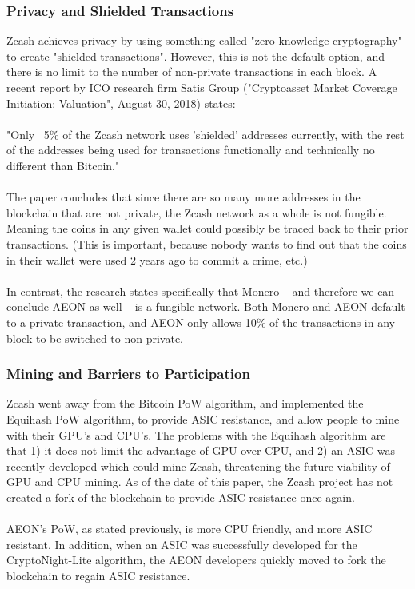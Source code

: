 \subsubsection{Privacy and Shielded Transactions}
Zcash achieves privacy by using something called "zero-knowledge cryptography" to create "shielded transactions".  However, this is not the default option, and there is no limit to the number of non-private transactions in each block.  A recent report by ICO research firm Satis Group ("Cryptoasset Market Coverage Initiation: Valuation", August 30, 2018) states:\\
\\ 
"Only ~5\%  of the Zcash network uses 'shielded' addresses currently, with the rest of the addresses being used for transactions functionally and technically no different than Bitcoin."\\
\\
The paper concludes that since there are so many more addresses in the blockchain that are not private, the Zcash network as a whole is not fungible.  Meaning the coins in any given wallet could possibly be traced back to their prior transactions.  (This is important, because nobody wants to find out that the coins in their wallet were used 2 years ago to commit a crime, etc.)\\
\\
In contrast, the research states specifically that Monero -- and therefore we can conclude AEON as well -- is a fungible network.  Both Monero and AEON default to a private transaction, and AEON only allows 10\% of the transactions in any block to be switched to non-private.

\subsubsection{Mining and Barriers to Participation}
Zcash went away from the Bitcoin PoW algorithm, and implemented the Equihash PoW algorithm, to provide ASIC resistance, and allow people to mine with their GPU’s and CPU’s.  The problems with the Equihash algorithm are that 1) it does not limit the advantage of GPU over CPU, and 2) an ASIC was recently developed which could mine Zcash, threatening the future viability of GPU and CPU mining.   As of the date of this paper, the Zcash project has not created a fork of the blockchain to provide ASIC resistance once again.\\
\\
AEON's PoW, as stated previously, is more CPU friendly, and more ASIC resistant.  In addition, when an ASIC was successfully developed for the CryptoNight-Lite algorithm, the AEON developers quickly moved to fork the blockchain to regain ASIC resistance.


